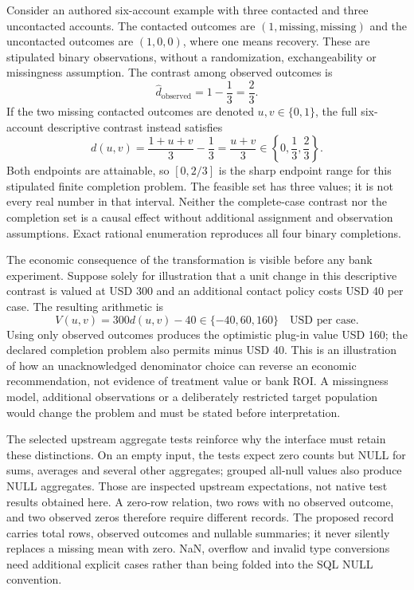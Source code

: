 Consider an authored six-account example with three contacted and three
uncontacted accounts. The contacted outcomes are $(1,\mathrm{missing},
\mathrm{missing})$ and the uncontacted outcomes are $(1,0,0)$, where one means
recovery. These are stipulated binary observations, without a randomization,
exchangeability or missingness assumption. The contrast among observed
outcomes is
\begin{equation}
 \widehat d_{\mathrm{observed}}=1-\frac13=\frac23.
 \label{exec19:duckdb-observed}
\end{equation}
If the two missing contacted outcomes are denoted $u,v\in\{0,1\}$, the
full six-account descriptive contrast instead satisfies
\begin{equation}
 d(u,v)=\frac{1+u+v}{3}-\frac13
       =\frac{u+v}{3}\in\left\{0,\frac13,\frac23\right\}.
 \label{exec19:duckdb-completions}
\end{equation}
Both endpoints are attainable, so $[0,2/3]$ is the sharp endpoint range for
this stipulated finite completion problem. The feasible set has three values;
it is not every real number in that interval. Neither the complete-case
contrast nor the completion set is a causal effect without additional
assignment and observation assumptions. Exact rational enumeration reproduces
all four binary completions.\citep{exec19_duckdb_reference}

The economic consequence of the transformation is visible before any bank
experiment. Suppose solely for illustration that a unit change in this
descriptive contrast is valued at USD 300 and an additional contact policy
costs USD 40 per case. The resulting arithmetic is
\begin{equation}
 V(u,v)=300d(u,v)-40\in\{-40,60,160\}\quad\text{USD per case}.
 \label{exec19:duckdb-value}
\end{equation}
Using only observed outcomes produces the optimistic plug-in value USD 160;
the declared completion problem also permits minus USD 40. This is an
illustration of how an unacknowledged denominator choice can reverse an
economic recommendation, not evidence of treatment value or bank ROI. A
missingness model, additional observations or a deliberately restricted target
population would change the problem and must be stated before interpretation.
\citep{exec19_duckdb_reference}

The selected upstream aggregate tests reinforce why the interface must retain
these distinctions. On an empty input, the tests expect zero counts but NULL
for sums, averages and several other aggregates; grouped all-null values also
produce NULL aggregates. Those are inspected upstream expectations, not native
test results obtained here. A zero-row relation, two rows with no observed
outcome, and two observed zeros therefore require different records. The
proposed record carries total rows, observed outcomes and nullable summaries;
it never silently replaces a missing mean with zero. NaN, overflow and invalid
type conversions need additional explicit cases rather than being folded into
the SQL NULL convention.\citep{exec19_duckdb_source,exec19_duckdb_reference}

